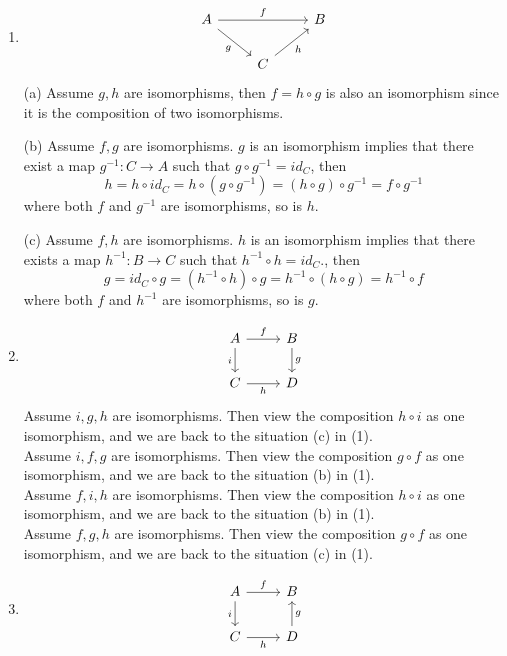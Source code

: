 \documentclass[a4paper, 12pt]{article}
\begin{document}
\begin{solution}
\begin{enumerate}[(1)]
\item \[\begin{tikzcd}
	A && B \\
	& C
	\arrow["f", from=1-1, to=1-3]
	\arrow["g"', from=1-1, to=2-2]
	\arrow["h"', from=2-2, to=1-3]
\end{tikzcd}\]
(a) Assume \(g,h\) are isomorphisms, then \(f=h\circ g\) is also an isomorphism since it is the composition of two isomorphisms. 
\par 
(b) Assume \(f,g\) are isomorphisms. \(g\) is an isomorphism implies that there exist a map \(g^{-1}:C\rightarrow A\) such that \(g\circ g^{-1}=id_C\), then 
\[h=h\circ id_C=h\circ (g\circ g^{-1})=(h\circ g)\circ g^{-1}=f\circ g^{-1}\]
where both \(f\) and \(g^{-1}\) are isomorphisms, so is \(h\).
\par 
(c) Assume \(f,h\) are isomorphisms. \(h\) is an isomorphism implies that there exists a map \(h^{-1}:B\rightarrow C\) such that \(h^{-1}\circ h=id_C\)., then 
\[g=id_C\circ g=(h^{-1}\circ h)\circ g=h^{-1}\circ (h\circ g)=h^{-1}\circ f\]
where both \(f\) and \(h^{-1}\) are isomorphisms, so is \(g\).
\item \[\begin{tikzcd}
	A & B \\
	C & D
	\arrow["f", from=1-1, to=1-2]
	\arrow["i"', from=1-1, to=2-1]
	\arrow["g", from=1-2, to=2-2]
	\arrow["h"', from=2-1, to=2-2]
\end{tikzcd}\]
Assume \(i,g,h\) are isomorphisms. Then view the composition \(h\circ i\) as one isomorphism, and we are back to the situation (c) in (1).\\ 
Assume \(i,f,g\) are isomorphisms. Then view the composition \(g\circ f\) as one isomorphism, and we are back to the situation (b) in (1).\\
Assume \(f,i,h\) are isomorphisms. Then view the composition \(h\circ i\) as one isomorphism, and we are back to the situation (b) in (1).\\ 
Assume \(f,g,h\) are isomorphisms. Then view the composition \(g\circ f\) as one isomorphism, and we are back to the situation (c) in (1).
\item \[\begin{tikzcd}
	A & B \\
	C & D
	\arrow["f", from=1-1, to=1-2]
	\arrow["i"', from=1-1, to=2-1]
	\arrow["h"', from=2-1, to=2-2]
	\arrow["g"', from=2-2, to=1-2]
\end{tikzcd}\]

\end{enumerate}
\end{solution}
\end{document}
